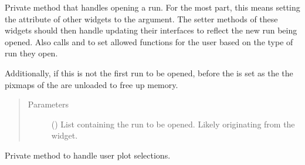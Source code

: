 \documentclass[letterpaper,10pt,english]{sphinxmanual}
\begin{document}
\begin{fulllineitems}
\begin{fulllineitems}
\end{fulllineitems}


\begin{fulllineitems}
\label{\detokenize{polo.windows:polo.windows.main_window.MainWindow._handle_opening_run}}
Private method that handles opening a run. For the most part,
this means setting the  attribute of other widgets to the
 argument. The setter methods of these widgets should then handle
updating their interfaces to reflect the new run being
opened. Also calls {\hyperref[\detokenize{polo.windows:polo.windows.main_window.MainWindow._tab_limiter}]{}}
and {\hyperref[\detokenize{polo.windows:polo.windows.main_window.MainWindow._plot_limiter}]{}} to set 
allowed functions for the user based on the type of run they open.

Additionally, if this is not the first run to be opened, before
the  is set as the  the pixmaps of the 
 are unloaded to free up memory.
\begin{quote}\begin{description}
\item[{Parameters}] \leavevmode
{} () \textendash{} List containing the run to be opened. Likely originating from
the  widget.

\end{description}\end{quote}

\end{fulllineitems}


\begin{fulllineitems}
\label{\detokenize{polo.windows:polo.windows.main_window.MainWindow._handle_plot_selection}}
Private method to handle user plot selections.


\end{fulllineitems}
\end{fulllineitems}
\end{document}
